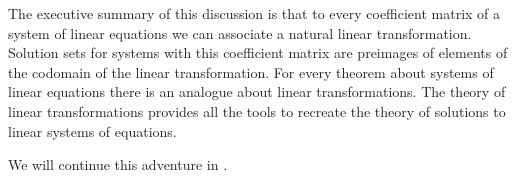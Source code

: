 %
The executive summary of this discussion is that to every coefficient matrix of a system of linear equations we can associate a natural linear transformation.  Solution sets for systems with this coefficient matrix are preimages of elements of the codomain of the linear transformation.  For every theorem about systems of linear equations there is an analogue about linear transformations.  The theory of linear transformations provides all the tools to recreate the theory of solutions to linear systems of equations.\par
%
We will continue this adventure in .
%
